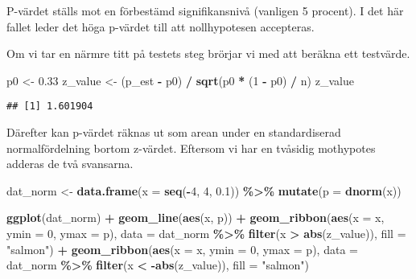 \documentclass[
]{book}
\newenvironment{Shaded}{\begin{snugshade}}{\end{snugshade}}
\newcommand{\AttributeTok}[1]{\textcolor[rgb]{0.13,0.29,0.53}{#1}}
\newcommand{\DecValTok}[1]{\textcolor[rgb]{0.00,0.00,0.81}{#1}}
\newcommand{\FloatTok}[1]{\textcolor[rgb]{0.00,0.00,0.81}{#1}}
\newcommand{\FunctionTok}[1]{\textcolor[rgb]{0.13,0.29,0.53}{\textbf{#1}}}
\newcommand{\NormalTok}[1]{#1}
\newcommand{\OtherTok}[1]{\textcolor[rgb]{0.56,0.35,0.01}{#1}}
\newcommand{\SpecialCharTok}[1]{\textcolor[rgb]{0.81,0.36,0.00}{\textbf{#1}}}
\newcommand{\StringTok}[1]{\textcolor[rgb]{0.31,0.60,0.02}{#1}}
\theoremstyle{definition}
\theoremstyle{definition}
\theoremstyle{definition}
\theoremstyle{definition}
\theoremstyle{remark}
\begin{document}
P-värdet ställs mot en förbestämd signifikansnivå (vanligen 5 procent). I det här fallet leder det höga p-värdet till att nollhypotesen accepteras.

Om vi tar en närmre titt på testets steg brörjar vi med att beräkna ett testvärde.

\begin{Shaded}
\begin{Highlighting}[]
\NormalTok{p0 }\OtherTok{\textless{}{-}} \FloatTok{0.33}
\NormalTok{z\_value }\OtherTok{\textless{}{-}}\NormalTok{ (p\_est }\SpecialCharTok{{-}}\NormalTok{ p0) }\SpecialCharTok{/} \FunctionTok{sqrt}\NormalTok{(p0 }\SpecialCharTok{*}\NormalTok{ (}\DecValTok{1} \SpecialCharTok{{-}}\NormalTok{ p0) }\SpecialCharTok{/}\NormalTok{ n)}
\NormalTok{z\_value}
\end{Highlighting}
\end{Shaded}

\begin{verbatim}
## [1] 1.601904
\end{verbatim}

Därefter kan p-värdet räknas ut som arean under en standardiserad normalfördelning bortom z-värdet. Eftersom vi har en tvåsidig mothypotes adderas de två svansarna.

\begin{Shaded}
\begin{Highlighting}[]
\NormalTok{dat\_norm }\OtherTok{\textless{}{-}} \FunctionTok{data.frame}\NormalTok{(}\AttributeTok{x =} \FunctionTok{seq}\NormalTok{(}\SpecialCharTok{{-}}\DecValTok{4}\NormalTok{, }\DecValTok{4}\NormalTok{, }\FloatTok{0.1}\NormalTok{)) }\SpecialCharTok{\%\textgreater{}\%} 
  \FunctionTok{mutate}\NormalTok{(}\AttributeTok{p =} \FunctionTok{dnorm}\NormalTok{(x))}

\FunctionTok{ggplot}\NormalTok{(dat\_norm) }\SpecialCharTok{+}
  \FunctionTok{geom\_line}\NormalTok{(}\FunctionTok{aes}\NormalTok{(x, p)) }\SpecialCharTok{+}
  \FunctionTok{geom\_ribbon}\NormalTok{(}\FunctionTok{aes}\NormalTok{(}\AttributeTok{x =}\NormalTok{ x, }\AttributeTok{ymin =} \DecValTok{0}\NormalTok{, }\AttributeTok{ymax =}\NormalTok{ p), }\AttributeTok{data =}\NormalTok{ dat\_norm }\SpecialCharTok{\%\textgreater{}\%} \FunctionTok{filter}\NormalTok{(x }\SpecialCharTok{\textgreater{}} \FunctionTok{abs}\NormalTok{(z\_value)), }\AttributeTok{fill =} \StringTok{"salmon"}\NormalTok{) }\SpecialCharTok{+}
  \FunctionTok{geom\_ribbon}\NormalTok{(}\FunctionTok{aes}\NormalTok{(}\AttributeTok{x =}\NormalTok{ x, }\AttributeTok{ymin =} \DecValTok{0}\NormalTok{, }\AttributeTok{ymax =}\NormalTok{ p), }\AttributeTok{data =}\NormalTok{ dat\_norm }\SpecialCharTok{\%\textgreater{}\%} \FunctionTok{filter}\NormalTok{(x }\SpecialCharTok{\textless{}} \SpecialCharTok{{-}}\FunctionTok{abs}\NormalTok{(z\_value)), }\AttributeTok{fill =} \StringTok{"salmon"}\NormalTok{)}
\end{Highlighting}
\end{Shaded}
\end{document}
